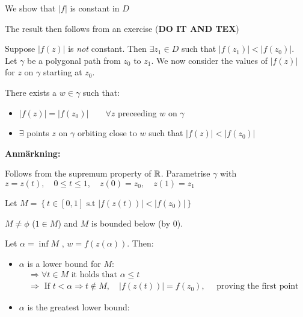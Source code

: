 \begin{prf}[]{}
  We show that $\left|f\right|$ is constant in $D$
  \par\bigskip
  \noindent The result then follows from an exercise (\textbf{DO IT AND TEX})
  \par\bigskip
  \noindent Suppose $\left|f(z)\right|$ is \textit{not} constant. Then $\exists z_1\in D$ such that $\left|f(z_1)\right|<\left|f(z_0)\right|$. Let $\gamma$ be a polygonal path from $z_0$ to $z_1$. We now consider the values of $\left|f(z)\right|$ for $z$ on $\gamma$ starting at $z_0$.
  \par\bigskip
  \noindent There exists a $w\in \gamma$ such that:\par
  \begin{itemize}
    \item $\left|f(z)\right| = \left|f(z_0)\right|\qquad\forall z$ preceeding $w$ on $\gamma$\par
    \item $\exists$ points $z$ on $\gamma$ orbiting close to $w$ such that $\left|f(z)\right|<\left|f(z_0)\right|$
  \end{itemize}
  \par\bigskip
  \noindent\textbf{Anmärkning:}\par
  \noindent Follows from the supremum property of $\mathbb{R}$. Parametrise $\gamma$ with $z = z(t),\quad 0\leq t\leq 1, \quad z(0) = z_0,\quad z(1) = z_1$\par
  \noindent Let $M = \left\{t\in[0,1]\text{ s.t } \left|f(z(t))\right|<\left|f(z_0)\right|\right\}$\par
  \noindent $M\neq\phi$ ($1\in M$) and $M$ is bounded below (by 0).\par
  \noindent Let $\alpha = \inf M$ , $w = f(z(\alpha))$. Then:\par
  \begin{itemize}
    \item $\alpha$ is a lower bound for $M$:
      \begin{equation*}
        \begin{gathered}
          \Rightarrow \forall t\in M\text{ it holds that } \alpha\leq t\\
          \Rightarrow\text{ If } t<\alpha\Rightarrow t\not\in M,\quad \left|f(z(t))\right| = f(z_0),\quad\text{ proving the first point}
        \end{gathered}
      \end{equation*}
      \par\bigskip
    \item $\alpha$ is the greatest lower bound:

\end{itemize}
\end{prf}
